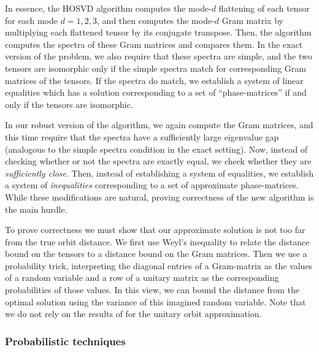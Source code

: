 \documentclass[11pt]{article}
\numberwithin{equation}{section}
\theoremstyle{remark}
\begin{document}
In essence, the HOSVD algorithm computes the mode-$d$ flattening of each tensor for each mode $d=1,2,3$, and then computes the mode-$d$ Gram matrix by multiplying each flattened tensor by its conjugate transpose. Then, the algorithm computes the spectra of these Gram matrices and compares them. In the exact version of the problem, we also require that these spectra are simple, and the two tensors are isomorphic only if the simple spectra match for corresponding Gram matrices of the tensors. If the spectra do match, we establish a system of linear equalities which has a solution corresponding to a set of ``phase-matrices'' if and only if the tensors are isomorphic. 

In our robust version of the algorithm, we again compute the Gram matrices, and this time require that the spectra have a sufficiently large eigenvalue gap (analogous to the simple spectra condition in the exact setting). Now, instead of checking whether or not the spectra are exactly equal, we check whether they are \emph{sufficiently close}. Then, instead of establishing a system of equalities, we establish a system of \emph{inequalities} corresponding to a set of approximate phase-matrices. While these modifications are natural, proving correctness of the new algorithm is the main hurdle. 

To prove correctness we must show that our approximate solution is not too far from the true orbit distance. We first use Weyl's inequality to relate the distance bound on the tensors to a distance bound on the Gram matrices. Then we use a probability trick, interpreting the diagonal entries of a Gram-matrix as the values of a random variable and a row of a unitary matrix as the corresponding probabilities of those values. In this view, we can bound the distance from the optimal solution using the variance of this imagined random variable. Note that we do not rely on the results of \cite{burgisser_et_alCCC.2021.32} for the unitary orbit approximation.  


\subsubsection{Probabilistic techniques}
\end{document}
